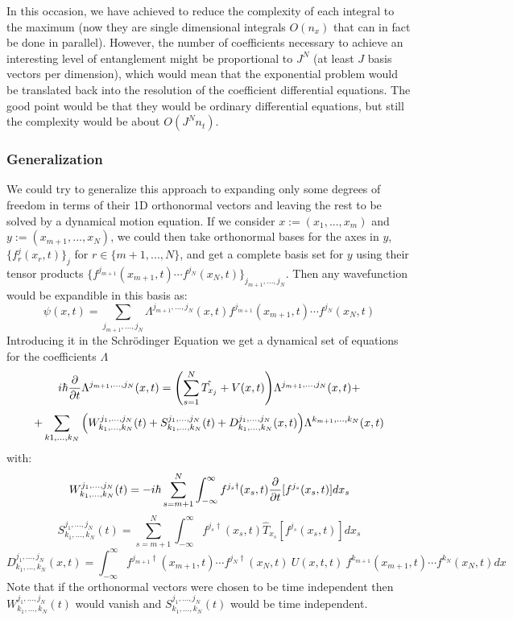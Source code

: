 \documentclass[11pt, a4paper]{article} %
\begin{document}
In this occasion, we have achieved to reduce the complexity of each integral to the maximum (now they are single dimensional integrals $O(n_x)$ that can in fact be done in parallel). However, the number of coefficients necessary to achieve an interesting level of entanglement might be proportional to $J^N$ (at least $J$ basis vectors per dimension), which would mean that the exponential problem would be translated back into the resolution of the coefficient differential equations. The good point would be that they would be ordinary differential equations, but still the complexity would be about $O(J^Nn_t)$.

\subsubsection{Generalization}
We could try to generalize this approach to expanding only some degrees of freedom in terms of their 1D orthonormal vectors and leaving the rest to be solved by a dynamical motion equation. If we consider $x:=(x_1,...,x_m)$ and $y:=(x_{m+1},...,x_N)$, we could then take orthonormal bases for the axes in $y$, $\{ f^j_r(x_r,t) \}_j$ for $r\in\{m+1,...,N\}$, and get a complete basis set for $y$ using their tensor products $\{f^{j_{m+1}}(x_{m+1},t)\cdots f^{j_N}(x_N,t) \}_{j_{m+1},...,j_N}$. Then any wavefunction would be expandible in this basis as:
\begin{equation}
\psi(x,t)=\sum_{j_{m+1},...,j_N} \Lambda^{j_{m+1},...,j_N}(x,t) f^{j_{m+1}}(x_{m+1},t)\cdots f^{j_N}(x_N,t)
\end{equation}
Introducing it in the Schrödinger Equation we get a dynamical set of equations for the coefficients $\Lambda$
\begin{equation}
i\hbar \pdv{}{t} \Lambda^{j_{m+1},...,j_N}(x,t) = \qty(\sum_{s=1}^N\hat{T_{x_j}}+V(x,t) )\Lambda^{j_{m+1},...,j_N}(x,t)+
\end{equation}
$$
 +\sum_{k1,...,k_N} \qty(W^{j_1,...,j_N}_{k_1,...,k_N}(t)+S^{j_1,...,j_N}_{k_1,...,k_N}(t)+D^{j_1,...,j_N}_{k_1,...,k_N}(x,t))\Lambda^{k_{m+1},...,k_N}(x,t)
$$
with:
\begin{equation}
W^{j_1,...,j_N}_{k_1,...,k_N}(t)=-i\hbar \sum_{s=m+1}^N \int_{-\infty}^{\infty}f^{j_s\dagger}(x_s,t)\pdv{}{t}[f^{j_s}(x_s,t)]dx_s
\end{equation}
\begin{equation}
S^{j_1,...,j_N}_{k_1,...,k_N}(t)=\sum_{s=m+1}^N \int_{-\infty}^{\infty}f^{j_s\dagger}(x_s,t)\hat{T}_{x_s}[f^{j_s}(x_s,t)]dx_s
\end{equation}
\begin{equation}
D^{j_1,...,j_N}_{k_1,...,k_N}(x,t)=\int_{-\infty}^{\infty}f^{j_{m+1}\dagger}(x_{m+1},t)\cdots f^{j_N\dagger}(x_N,t)\ U(x,t,t)\ f^{k_{m+1}}(x_{m+1},t)\cdots f^{k_N}(x_N,t) dx
\end{equation}
Note that if the orthonormal vectors were chosen to be time independent then $W^{j_1,...,j_N}_{k_1,...,k_N}(t)$ would vanish and $S^{j_1,...,j_N}_{k_1,...,k_N}(t)$ would be time independent. 
\end{document}
